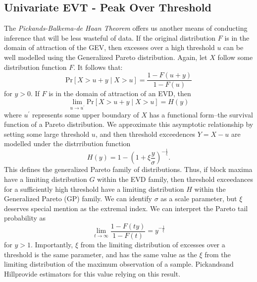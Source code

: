\subsection{Univariate EVT - Peak Over Threshold}
The \emph{Pickands-Balkema-de Haan Theorem}\citep{balkema1974,pickands1975} offers us another means
  of conducting inference that will be less wasteful of data.  If the original distribution $F$ is
  in the domain of attraction of the GEV, then excesses over a high threshold $u$ can be well modelled
  using the Generalized Pareto distribution.  Again, let $X$ follow some distribution function $F$.
  It follows that:
  \begin{equation*}
    \text{Pr}\left[X > u + y\mid X > u\right] = \frac{1 - F(u + y)}{1 - F(u)}
  \end{equation*}
  for $y > 0$.  If $F$ is in the domain of attraction of an EVD, then
  \begin{equation*}
    \lim\limits_{u\to u^{\prime}}\text{Pr}\left[X > u + y\mid X > u\right] = H(y)
  \end{equation*}
  where $u^{\prime}$ represents some upper boundary of $X$ has a functional form--the survival
  function of a Pareto distribution. We approximate this asymptotic relationship by setting some
  large threshold $u$, and then threshold exceedences $Y = X - u$ are modelled under the distrribution
  function
  \begin{equation*}
    \label{eqn:gp}
    H(y) = 1 - \left(1 + \xi\frac{y}{\sigma}\right)^{-\frac{1}{\xi}}.
  \end{equation*}
  This defines the generalized Pareto family of distributions.  Thus, if block maxima have a
  limiting distribution $G$ within the EVD family, then threshold exceedances for a sufficiently
  high threshold have a limiting distribution $H$ within the Generalized Pareto (GP) family.  We can
  identify $\sigma$ as a scale parameter, but $\xi$ deserves special mention as the extremal index.
  We can interpret the Pareto tail probability as
  \begin{equation*}
    \lim\limits_{t\to\infty}\frac{1 - F(ty)}{1 - F(t)} = y^{-\frac{1}{\xi}}
  \end{equation*}
  for $y > 1$.  Importantly, $\xi$ from the limiting distribution of excesses over a threshold is the
  same parameter, and has the same value as the $\xi$ from the limiting distribution of the maximum
  observation of a sample.  Pickands\needcite and Hill\needcite provide estimators for this value
  relying on this result.


